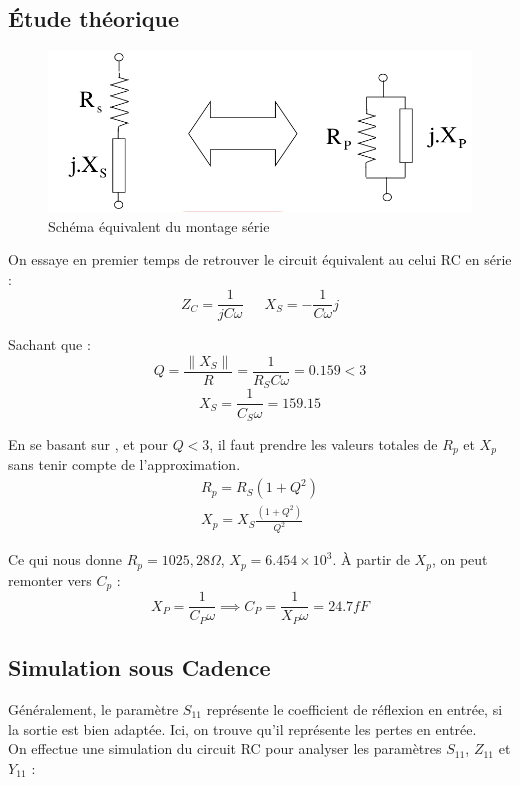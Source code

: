 \documentclass[a4paper]{article}
\begin{document}
\subsection{\'Etude th\'eorique}

\begin{figure}[!htb]
\begin{center}
  \includegraphics[scale=0.40]{circuit_parallel_equiv.png}
  \caption{Sch\'ema \'equivalent du montage s\'erie \cite{RFIC-cours}}
\end{center}
\end{figure}

On essaye en premier temps de retrouver le circuit \'equivalent au celui RC en s\'erie :
\begin{equation}
  Z_C = \frac{1}{jC\omega} \phantom{8} \phantom{8} \phantom{8} X_S = - \frac{1}{C\omega}j
\end{equation}

Sachant que :
\[
Q = \frac{\|X_S \|}{R} = \frac{1}{R_S C\omega} = 0.159 < 3
\]
\[
X_S = \frac{1}{C_S \omega} = 159.15
\]

En se basant sur \cite{RFIC-cours}, et pour $ Q < 3 $, il faut prendre les valeurs totales de $R_p$ et $X_p$ sans tenir compte
de l'approximation.
\begin{equation}
  \begin{split}
  R_p = R_S (1 + Q^2) \\
  X_p = X_S \frac{(1+Q^2)}{Q^2}
  \end{split}
\end{equation}

Ce qui nous donne $R_p = 1025,28 \Omega$, $X_p = 6.454 \times 10^3$.
\`A partir de $X_p$, on peut remonter vers $C_p$ :
\[
X_P = \frac{1}{C_P \omega} \implies C_P = \frac{1}{X_P \omega} = 24.7 fF
\]

\subsection{Simulation sous Cadence}
G\'en\'eralement, le param\`etre $S_11$ repr\'esente le coefficient de r\'eflexion en entr\'ee, si la sortie est bien adapt\'ee.
Ici, on trouve qu'il repr\'esente les pertes en entr\'ee.\\
On effectue une simulation du circuit RC pour analyser les param\`etres $S_{11}$, $Z_{11}$ et $Y_{11}$ :
\end{document}
